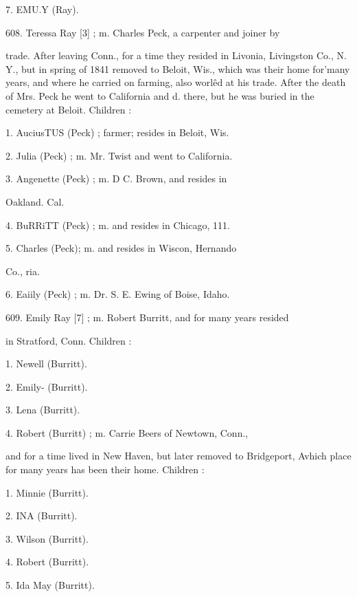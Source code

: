 7. EMU.Y (Ray). 

608. Teressa Ray [3] ; m. Charles Peck, a carpenter and joiner by 

trade. After leaving Conn., for a time they resided in Livonia, 
Livingston Co., N. Y., but in spring of 1841 removed to Beloit, 
Wis., which was their home for'many years, and where he 
carried on farming, also worl\^ed at his trade. After the 
death of Mrs. Peck he went to California and d. there, but he 
was buried in the cemetery at Beloit. Children : 

1. AuciusTUS (Peck) ; farmer; resides in Beloit, Wis. 

2. Julia (Peck) ; m. Mr. Twist and went to California. 

3. Angenette (Peck) ; m. D C. Brown, and resides in 

Oakland. Cal. 

4. BuRRiTT (Peck) ; m. and resides in Chicago, 111. 

5. Charles (Peck); m. and resides in Wiscon, Hernando 

Co., ria. 

6. Eaiily (Peck) ; m. Dr. S. E. Ewing of Boise, Idaho. 

609. Emily Ray [7] ; m. Robert Burritt, and for many years resided 

in Stratford, Conn. Children : 

1. Newell (Burritt). 

2. Emily- (Burritt). 

3. Lena (Burritt). 

4. Robert (Burritt) ; m. Carrie Beers of Newtown, Conn., 

and for a time lived in New Haven, but later removed 
to Bridgeport, Avhich place for many years has been 
their home. Children : 

1. Minnie (Burritt). 

2. INA (Burritt). 

3. Wilson (Burritt). 

4. Robert (Burritt). 

5. Ida May (Burritt). 





